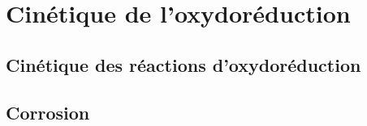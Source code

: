 \documentclass[11pt,a4paper,fleqn,pdftex]{report}
\begin{document}
\chapter{Cinétique de l'oxydoréduction} %
\label{cha:cinetique_de_l_oxydoreduction}
\section{Cinétique des réactions d'oxydoréduction} %
\label{sec:cinetique_des_reactions_d_oxydoreduction}

\section{Corrosion} %
\label{sec:corrosion}

\end{document}
